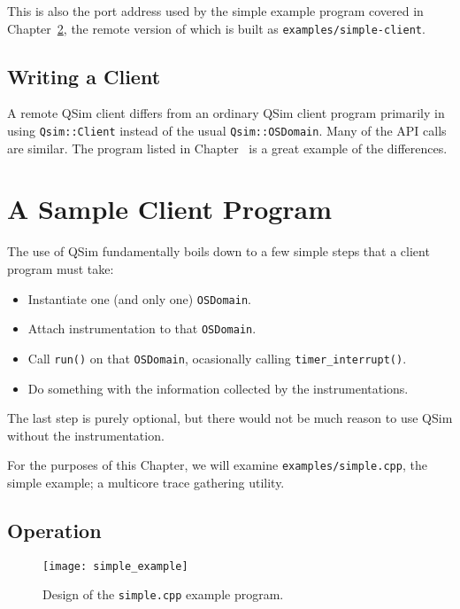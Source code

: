 \documentclass[letterpaper, 10pt]{book}
\begin{document}
This is also the port address used by the simple example program covered in
Chapter~\ref{chap:example}, the remote version of which is built as 
\texttt{examples/simple-client}.

\section{Writing a Client}

A remote QSim client differs from an ordinary QSim client program primarily in
using \texttt{Qsim::Client} instead of the usual \texttt{Qsim::OSDomain}. Many
of the API calls are similar. The program listed in Chapter~\label{chap:example}
is a great example of the differences.

\chapter{A Sample Client Program} \label{chap:example}
The use of QSim fundamentally boils down to a few simple steps that a client
program must take:
\begin{itemize}
  \item{Instantiate one (and only one) \texttt{OSDomain}.}
  \item{Attach instrumentation to that \texttt{OSDomain}.}
  \item{Call \texttt{run()} on that \texttt{OSDomain}, ocasionally calling
        \texttt{timer\_interrupt()}.} 
  \item{Do something with the information collected by the instrumentations.}
\end{itemize}

The last step is purely optional, but there would not be much reason to use
QSim without the instrumentation.

For the purposes of this Chapter, we will examine \texttt{examples/simple.cpp},
the simple example; a multicore trace gathering utility.

\section{Operation}

\begin{figure}
\begin{center}
\texttt{[image: simple\_example]}
\caption{Design of the \texttt{simple.cpp} example program.}
\label{fig:simplecpp}
\end{center}
\end{figure}
\end{document}
